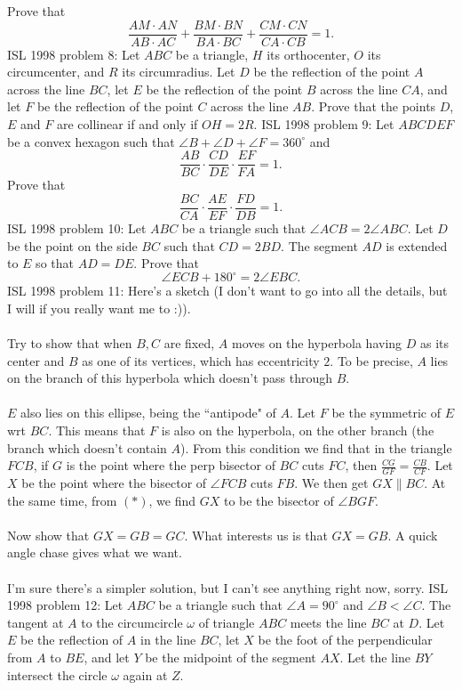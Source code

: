 Prove that
\[
\frac {AM \cdot AN}{AB \cdot AC} + \frac {BM \cdot BN}{BA \cdot BC} + \frac {CM \cdot CN}{CA \cdot CB} = 1.
\] 
ISL 1998 problem 8:  Let $ABC$ be a triangle, $H$ its orthocenter, $O$ its circumcenter, and $R$ its circumradius. Let $D$ be the reflection of the point $A$ across the line $BC$, let $E$ be the reflection of the point $B$ across the line $CA$, and let $F$ be the reflection of the point $C$ across the line $AB$. Prove that the points $D$, $E$ and $F$ are collinear if and only if $OH=2R$. 
ISL 1998 problem 9:  Let $ABCDEF$ be a convex hexagon such that $\angle B+\angle D+\angle F=360^{\circ }$ and
\[ \frac{AB}{BC} \cdot \frac{CD}{DE} \cdot \frac{EF}{FA} = 1. \]
Prove that
\[ \frac{BC}{CA} \cdot \frac{AE}{EF} \cdot \frac{FD}{DB} = 1. \] 
ISL 1998 problem 10:  Let $ABC$ be a triangle such that $\angle ACB=2\angle ABC$. Let $D$ be the point on the side $BC$ such that $CD=2BD$. The segment $AD$ is extended to $E$ so that $AD=DE$. Prove that
\[ \angle ECB+180^{\circ }=2\angle EBC. \] 
ISL 1998 problem 11:  Here's a sketch (I don't want to go into all the details, but I will if you really want me to :)). \\\\
Try to show that when $B,C$ are fixed, $A$ moves on the hyperbola having $D$ as its center and $B$ as one of its vertices, which has eccentricity $2$. To be precise, $A$ lies on the branch of this hyperbola which doesn't pass through $B$. \\\\
$E$ also lies on this ellipse, being the ``antipode" of $A$. Let $F$ be the symmetric of $E$ wrt $BC$. This means that $F$ is also on the hyperbola, on the other branch (the branch which doesn't contain $A$). From this condition we find that in the triangle $FCB$, if $G$ is the point where the perp bisector of $BC$ cuts $FC$, then $\frac{CG}{GF}=\frac{CB}{CF}$. Let $X$ be the point where the bisector of $\angle FCB$ cuts $FB$. We then get $GX\|BC$. At the same time, from $(*)$, we find $GX$ to be the bisector of $\angle BGF$. \\\\
Now show that $GX=GB=GC$. What interests us is that $GX=GB$. A quick angle chase gives what we want. \\\\
I'm sure there's a simpler solution, but I can't see anything right now, sorry. 
ISL 1998 problem 12:  Let $ABC$ be a triangle such that $\angle A=90^{\circ }$ and $\angle B<\angle C$. The tangent at $A$ to the circumcircle $\omega$ of triangle $ABC$ meets the line $BC$ at $D$. Let $E$ be the reflection of $A$ in the line $BC$, let $X$ be the foot of the perpendicular from $A$ to $BE$, and let $Y$ be the midpoint of the segment $AX$. Let the line $BY$ intersect the circle $\omega$ again at $Z$. \\\\
